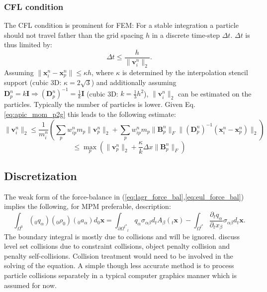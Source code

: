 \documentclass[m,times]{cgMA}
\begin{document}
\subsubsection{CFL condition} \label{sec:cfl}
The CFL condition is prominent for FEM: For a stable integration a particle should not travel father than the grid spacing $h$ in a discrete time-step $\Delta t$. $\Delta t$ is thus limited by:
\begin{equation}
  \Delta t \leq \frac{h}{\|\boldsymbol{v}^n_i\|_2}.
\end{equation}
Assuming $\|\boldsymbol{x}_i^n -\boldsymbol{x}_p^n\| \leq \kappa h$, where $\kappa$ is determined by the interpolation stencil support (cubic 3D: $\kappa = 2\sqrt{3}$) and additionally assuming $\boldsymbol{D}_p^n = k\boldsymbol{I} \Rightarrow (\boldsymbol{D}_p^n)^{-1} = \frac{1}{k}\boldsymbol{I}$ (cubic 3D: $k=\frac{1}{3}h^2$),
$\|\boldsymbol{v}^n_i\|_2$ can be estimated on the particles. Typically the number of particles is lower. Given Eq. \ref{eq:apic_mom_p2g} this leads to the following estimate:
$$
\|\boldsymbol{v}^n_i\|_2 \leq \frac{1}{m_i^n}\left(\sum _ { p } w _ { i p } ^ { n } m _ { p } \| \boldsymbol { v } _ { p } ^ { n } \|_2 + \sum _ { p } w _ { i p } ^ { n } m _ { p } \| \boldsymbol { B } _ { p } ^ { n } \| _ { F } \| ( \boldsymbol { D } _ { p } ^ { n } ) ^ { - 1 } ( \boldsymbol { x } _ { i } ^ { n } - \boldsymbol { x } _ { p } ^ { n } ) \|_2\right)
$$
\begin{equation}
\leq \max _ { p } ( \| \boldsymbol { v } _ { p } ^ { n } \|_2 + \frac { \kappa } { k } \Delta x \| \boldsymbol { B } _ { p } ^ { n } \| _ { F } )
\end{equation}
\begin{flushright}\cite{MPM:APIC}\end{flushright}
\subsection{Discretization}\label{sec:discretization}
The weak form of the force-balance in (\ref{eq:lagr_force_bal},\ref{eq:eul_force_bal}) implies the following, for MPM preferable, description:
\begin{equation} \label{eq:weak_mpm}
  \int _ { \Omega ^ { 0 } } (_0q _ \alpha) (_0\rho_0) (_0a _\alpha)  d _0\boldsymbol{x}= \int _ { \partial \Omega ^ { t^n } } _tq _ \alpha \sigma _ {\alpha\beta} d_tA_\beta(_t\boldsymbol{x}) -  \int _ { \Omega ^ { t^n} } \frac{\partial _tq _ \alpha}{\partial _tx_\beta} \sigma _ {\alpha\beta} d_t\boldsymbol{x}.
\end{equation}
The boundary integral is mostly due to collisions and will be ignored. \cite{MPM:OPTIMI_INTEGR} discuss level set collisions due to constraint collisions, object penalty collision and penalty self-collisions. Collision treatment would need to be involved in the solving of the equation. A simple though less accurate method is to process particle collisions separately in a typical computer graphics manner which is assumed for now.
\end{document}
